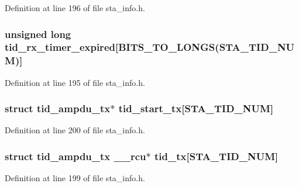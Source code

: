 Definition at line 196 of file sta\-\_\-info.\-h.

\hypertarget{structsta__ampdu__mlme_a53e1819c9e1189bae325027254946f53}{
\subsubsection[{tid\-\_\-rx\-\_\-timer\-\_\-expired}]{\setlength{\rightskip}{0pt plus 5cm}unsigned long tid\-\_\-rx\-\_\-timer\-\_\-expired\mbox{[}B\-I\-T\-S\-\_\-\-T\-O\-\_\-\-L\-O\-N\-G\-S({\bf S\-T\-A\-\_\-\-T\-I\-D\-\_\-\-N\-U\-M})\mbox{]}}}\label{structsta__ampdu__mlme_a53e1819c9e1189bae325027254946f53}


Definition at line 195 of file sta\-\_\-info.\-h.

\hypertarget{structsta__ampdu__mlme_a11dbf950521d406406f6689d3db802fa}{
\subsubsection[{tid\-\_\-start\-\_\-tx}]{\setlength{\rightskip}{0pt plus 5cm}struct {\bf tid\-\_\-ampdu\-\_\-tx}$\ast$ tid\-\_\-start\-\_\-tx\mbox{[}{\bf S\-T\-A\-\_\-\-T\-I\-D\-\_\-\-N\-U\-M}\mbox{]}}}\label{structsta__ampdu__mlme_a11dbf950521d406406f6689d3db802fa}


Definition at line 200 of file sta\-\_\-info.\-h.

\hypertarget{structsta__ampdu__mlme_acc2de99b986d5fa4b83081a609014228}{
\subsubsection[{tid\-\_\-tx}]{\setlength{\rightskip}{0pt plus 5cm}struct {\bf tid\-\_\-ampdu\-\_\-tx} \-\_\-\-\_\-rcu$\ast$ tid\-\_\-tx\mbox{[}{\bf S\-T\-A\-\_\-\-T\-I\-D\-\_\-\-N\-U\-M}\mbox{]}}}\label{structsta__ampdu__mlme_acc2de99b986d5fa4b83081a609014228}


Definition at line 199 of file sta\-\_\-info.\-h.

